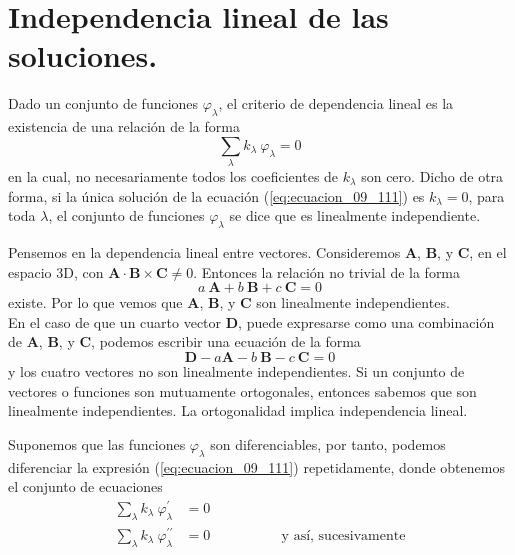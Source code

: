 \section{Independencia lineal de las soluciones.}
Dado un conjunto de funciones $\varphi_{\lambda}$, el criterio de dependencia lineal es la existencia de una relación de la forma
\begin{equation}
\sum_{\lambda} k_{\lambda} \: \varphi_{\lambda} = 0 
\label{eq:ecuacion_09_111}
\end{equation}
en la cual, no necesariamente todos los coeficientes de $k_{\lambda}$ son cero. Dicho de otra forma, si la única solución de la ecuación (\ref{eq:ecuacion_09_111}) es $k_{\lambda} = 0$, para toda $\lambda$, el conjunto de funciones $\varphi_{\lambda}$ se dice que es linealmente independiente.
\par
Pensemos en la dependencia lineal entre vectores. Consideremos $\mathbf{A}$, $\mathbf{B}$, y $\mathbf{C}$, en el espacio 3D, con $\mathbf{A} \cdot \mathbf{B} \times \mathbf{C} \neq 0$. Entonces la relación no trivial de la forma
\begin{equation}
a \: \mathbf{A} + b \: \textbf{B} + c \: \mathbf{C} = 0
\label{eq:ecuacion_09_112}
\end{equation}
existe. Por lo que vemos que $\mathbf{A}$, $\mathbf{B}$, y $\mathbf{C}$ son linealmente independientes.
\\
En el caso de que un cuarto vector $\mathbf{D}$, puede expresarse como una combinación de $\mathbf{A}$, $\mathbf{B}$, y $\mathbf{C}$, podemos escribir una ecuación de la forma
\begin{equation}
\mathbf{D} -  a \mathbf{A} - b \: \textbf{B} - c \: \mathbf{C} = 0
\label{eq:ecuacion_09_113}
\end{equation}
y los cuatro vectores no son linealmente independientes. Si un conjunto de vectores o funciones son mutuamente ortogonales, entonces sabemos que son linealmente independientes. La ortogonalidad implica independencia lineal.
\par
Suponemos que las funciones $\varphi_{\lambda}$ son diferenciables, por tanto, podemos diferenciar la expresión (\ref{eq:ecuacion_09_111}) repetidamente, donde obtenemos el conjunto de ecuaciones
\begin{align}
\sum_{\lambda} k_{\lambda} \: \varphi^{\prime}_{\lambda} &= 0 \label{eq:ecuacion_09_114} \\
\sum_{\lambda} k_{\lambda} \: \varphi^{\prime \prime}_{\lambda} &= 0 \hspace{2cm} \mbox{ y así, sucesivamente} \label{eq:ecuacion_09_115}
\end{align}
